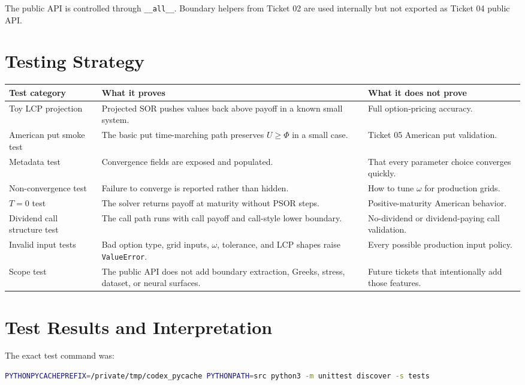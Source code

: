 \documentclass[11pt,a4paper]{article}
\newcommand{\code}[1]{\texttt{#1}}
\begin{document}
The public API is controlled through \code{\_\_all\_\_}. Boundary helpers from Ticket 02 are used
internally but not exported as Ticket 04 public API.

\section{Testing Strategy}

\begin{longtable}{L{0.25\textwidth}L{0.31\textwidth}L{0.32\textwidth}}
\toprule
Test category & What it proves & What it does not prove \\
\midrule
\endhead
Toy LCP projection &
Projected SOR pushes values back above payoff in a known small system. &
Full option-pricing accuracy. \\
American put smoke test &
The basic put time-marching path preserves \(U\geq\Phi\) in a small case. &
Ticket 05 American put validation. \\
Metadata test &
Convergence fields are exposed and populated. &
That every parameter choice converges quickly. \\
Non-convergence test &
Failure to converge is reported rather than hidden. &
How to tune \(\omega\) for production grids. \\
\(T=0\) test &
The solver returns payoff at maturity without PSOR steps. &
Positive-maturity American behavior. \\
Dividend call structure test &
The call path runs with call payoff and call-style lower boundary. &
No-dividend or dividend-paying call validation. \\
Invalid input tests &
Bad option type, grid inputs, \(\omega\), tolerance, and LCP shapes raise \code{ValueError}. &
Every possible production input policy. \\
Scope test &
The public API does not add boundary extraction, Greeks, stress, dataset, or neural surfaces. &
Future tickets that intentionally add those features. \\
\bottomrule
\end{longtable}

\section{Test Results and Interpretation}

The exact test command was:
\begin{lstlisting}[language=bash]
PYTHONPYCACHEPREFIX=/private/tmp/codex_pycache PYTHONPATH=src python3 -m unittest discover -s tests
\end{lstlisting}
\end{document}
